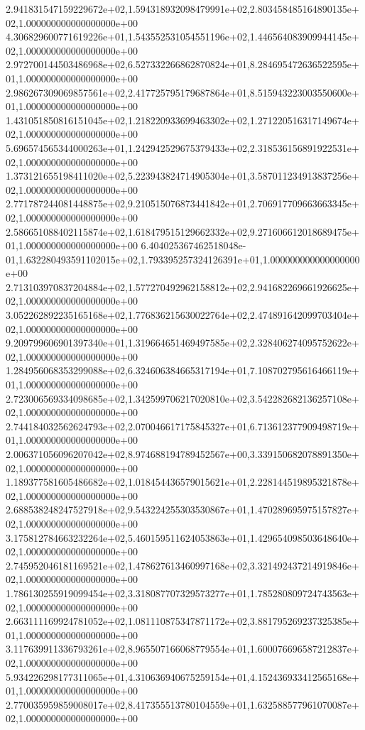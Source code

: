 2.941831547159229672e+02,1.594318932098479991e+02,2.803458485164890135e+02,1.000000000000000000e+00
4.306829600771619226e+01,1.543552531054551196e+02,1.446564083909944145e+02,1.000000000000000000e+00
2.972700144503486968e+02,6.527332266862870824e+01,8.284695472636522595e+01,1.000000000000000000e+00
2.986267309069857561e+02,2.417725795179687864e+01,8.515943223003550600e+01,1.000000000000000000e+00
1.431051850816151045e+02,1.218220933699463302e+02,1.271220516317149674e+02,1.000000000000000000e+00
5.696574565344000263e+01,1.242942529675379433e+02,2.318536156891922531e+02,1.000000000000000000e+00
1.373121655198411020e+02,5.223943824714905304e+01,3.587011234913837256e+02,1.000000000000000000e+00
2.771787244081448875e+02,9.210515076873441842e+01,2.706917709663663345e+02,1.000000000000000000e+00
2.586651088402115874e+02,1.618479515129662332e+02,9.271606612018689475e+01,1.000000000000000000e+00
6.404025367462518048e-01,1.632280493591102015e+02,1.793395257324126391e+01,1.000000000000000000e+00
2.713103970837204884e+02,1.577270492962158812e+02,2.941682269661926625e+02,1.000000000000000000e+00
3.052262892235165168e+02,1.776836215630022764e+02,2.474891642099703404e+02,1.000000000000000000e+00
9.209799606901397340e+01,1.319664651469497585e+02,2.328406274095752622e+02,1.000000000000000000e+00
1.284956068353299088e+02,6.324606384665317194e+01,7.108702795616466119e+01,1.000000000000000000e+00
2.723006569334098685e+02,1.342599706217020810e+02,3.542282682136257108e+02,1.000000000000000000e+00
2.744184032562624793e+02,2.070046617175845327e+01,6.713612377909498719e+01,1.000000000000000000e+00
2.006371056096207042e+02,8.974688194789452567e+00,3.339150682078891350e+02,1.000000000000000000e+00
1.189377581605486682e+02,1.018454436579015621e+01,2.228144519895321878e+02,1.000000000000000000e+00
2.688538248247527918e+02,9.543224255303530867e+01,1.470289695975157827e+02,1.000000000000000000e+00
3.175812784663232264e+02,5.460159511624053863e+01,1.429654098503648640e+02,1.000000000000000000e+00
2.745952046181169521e+02,1.478627613460997168e+02,3.321492437214919846e+02,1.000000000000000000e+00
1.786130255919099454e+02,3.318087707329573277e+01,1.785280809724743563e+02,1.000000000000000000e+00
2.663111169924781052e+02,1.081110875347871172e+02,3.881795269237325385e+01,1.000000000000000000e+00
3.117639911336793261e+02,8.965507166068779554e+01,1.600076696587212837e+02,1.000000000000000000e+00
5.934226298177311065e+01,4.310636940675259154e+01,4.152436933412565168e+01,1.000000000000000000e+00
2.770035959859008017e+02,8.417355513780104559e+01,1.632588577961070087e+02,1.000000000000000000e+00
